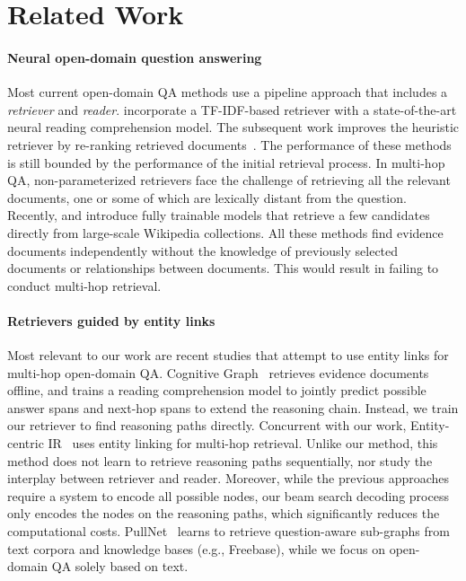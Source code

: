 \documentclass{article} \usepackage{iclr2020_conference,times}
\begin{document}
\vspace{-3.5mm}
\section{Related Work} \vspace{-2mm}
\paragraph{Neural open-domain question answering}
Most current open-domain QA methods use a pipeline approach that includes a {\it retriever} and {\it reader}. 
\cite{chen2017reading} incorporate a TF-IDF-based retriever with a state-of-the-art neural reading comprehension model.
The subsequent work improves the heuristic retriever by re-ranking retrieved documents~\citep{wang2018r,wang2018evidence,lee2018ranking,lin2018denoising}.
The performance of these methods is still bounded by the performance of the initial retrieval process. 
In multi-hop QA, non-parameterized retrievers face the challenge of retrieving all the relevant documents, one or some of which are lexically distant from the question.
Recently, \cite{lee-chang-toutanova:2019:ACL2019} and \cite{denspi} introduce fully trainable models that retrieve a few candidates directly from large-scale Wikipedia collections.
All these methods find evidence documents independently without the knowledge of previously selected documents or relationships between documents.
This would result in failing to conduct multi-hop retrieval.

\vspace{-2mm}
\paragraph{Retrievers guided by entity links}
Most relevant to our work are recent studies that attempt to use entity links for multi-hop open-domain QA. 
Cognitive Graph~\citep{cognitive_graph_2019} retrieves evidence documents offline, and trains a reading comprehension model to jointly predict possible answer spans and next-hop spans to extend the reasoning chain. Instead, we train our retriever to find reasoning paths directly.
Concurrent with our work, Entity-centric IR~\citep{godbole2019entity_links} uses entity linking for multi-hop retrieval.
Unlike our method, this method does not learn to retrieve reasoning paths sequentially, nor study the interplay between retriever and reader.
Moreover, while the previous approaches require a system to encode all possible nodes, our beam search decoding process only encodes the nodes on the reasoning paths, which significantly reduces the computational costs.
PullNet~\citep{sun-etal-2019-pullnet} learns to retrieve question-aware sub-graphs from text corpora and knowledge bases (e.g., Freebase), while we focus on open-domain QA solely based on text.
\end{document}
